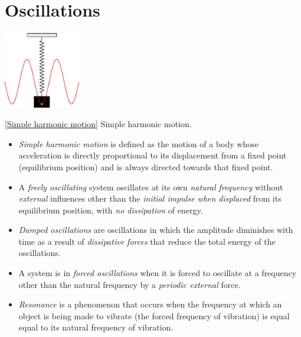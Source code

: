 \documentclass[oneside]{book}
\begin{document}
\chapter{Oscillations}
\begin{center}
    \includegraphics[width=0.25\textwidth,page=20]{../images/SHM/SHMCropped.pdf}
    \captionsetup{type=figure}
    \caption[figure]{\ref{Simple harmonic motion} Simple harmonic motion.}
\end{center}
\begin{itemize}
    \item \emph{Simple harmonic motion} is defined as the motion of a body whose acceleration is directly proportional to its displacement from a fixed point (equilibrium position) and is always directed towards that fixed point.
    \item A \emph{freely oscillating} system oscillates at its own \emph{natural frequency} without \emph{external} influences other than the \emph{initial impulse when displaced} from its equilibrium position, with \emph{no dissipation} of energy.
    \item \emph{Damped oscillations} are oscillations in which the amplitude diminishes with time as a result of \emph{dissipative forces} that reduce the total energy of the oscillations.
    \item A system is in \emph{forced oscillations} when it is forced to oscillate at a frequency other than the natural frequency by a \emph{periodic external} force.
    \item \emph{Resonance} is a phenomenon that occurs when the frequency at which an object is being made to vibrate (the forced frequency of vibration) is equal equal to its natural frequency of vibration.
\end{itemize}
\end{document}
